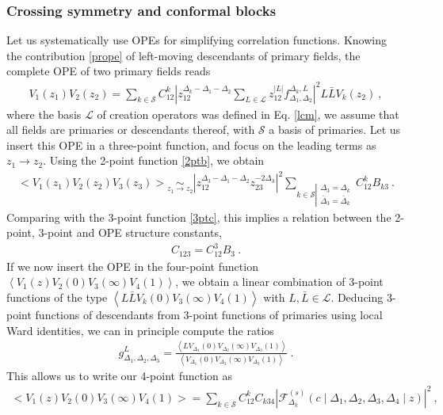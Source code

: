 \documentclass[12pt, a4paper]{article}
\theoremstyle{break}
\begin{document}
\subsubsection{Crossing symmetry and conformal blocks}\label{sec:cscb}

Let us systematically use OPEs for simplifying correlation functions. Knowing the contribution \eqref{prope} of left-moving descendants of primary fields, the complete OPE of two primary fields reads 
\begin{align}
 V_1(z_1)V_2(z_2) = \sum_{k\in\mathcal{S}} C_{12}^k \left|z_{12}^{\Delta_k-\Delta_1-\Delta_2}\sum_{L\in\mathcal{L}} z_{12}^{|L|}f_{\Delta_1,\Delta_2}^{\Delta_k,L}\right|^2 L\bar L V_k(z_2)\ ,
 \label{tope}
\end{align}
where the basis $\mathcal{L}$ of creation operators was defined in Eq. \eqref{lcm},
we assume that all fields are primaries or descendants thereof, with $\mathcal{S}$ a basis of primaries. Let us insert this OPE in a three-point function, and focus on the leading terms as $z_1\to z_2$. Using the 2-point function \eqref{2ptb}, we obtain
\begin{align}
  \Big< V_1(z_1)V_2(z_2)V_3(z_3) \Big> \underset{z_1\to z_2}{\sim} 
  \left|z_{12}^{\Delta_3-\Delta_1-\Delta_2}z_{23}^{-2\Delta_3}\right|^2 
  \sum_{k\in\mathcal{S}\left|\substack{\Delta_3=\Delta_k\\ \bar{\Delta}_3=\bar\Delta_k}\right. }
  C_{12}^k B_{k3}\ .
\end{align}
Comparing with the 3-point function \eqref{3ptc}, this implies a relation between the 2-point, 3-point and OPE structure constants,
\begin{align}
 \boxed{C_{123} = C_{12}^3B_{3}} \ .
 \label{ccb}
\end{align}
If we now insert the OPE in the four-point function $\left<V_1(z)V_2(0)V_3(\infty)V_4(1)\right>$, we obtain a linear combination of 3-point functions of the type $\left<L\bar{L}V_k(0) V_3(\infty)V_4(1)\right>$ with $L,\bar L\in\mathcal{L}$. Deducing 3-point functions of descendants from 3-point functions of primaries using local Ward identities, we can in principle compute the ratios
\begin{align}
 g^L_{\Delta_1,\Delta_2,\Delta_3} = \frac{\left< LV_{\Delta_1}(0) V_{\Delta_2}(\infty)V_{\Delta_3}(1)\right>}{\left< V_{\Delta_1}(0) V_{\Delta_2}(\infty)V_{\Delta_3}(1)\right>}\ .
\end{align}
This allows us to write our 4-point function as 
\begin{align}
 \boxed{\Big<V_1(z)V_2(0)V_3(\infty)V_4(1)\Big> = \sum_{k\in\mathcal{S}} C_{12}^k C_{k34} \left|\mathcal{F}^{(s)}_{\Delta_k}\left(c\middle|\Delta_1,\Delta_2,\Delta_3,\Delta_4\middle|z\right)\right|^2}  \ ,
 \label{sdec}
\end{align}
\end{document}
